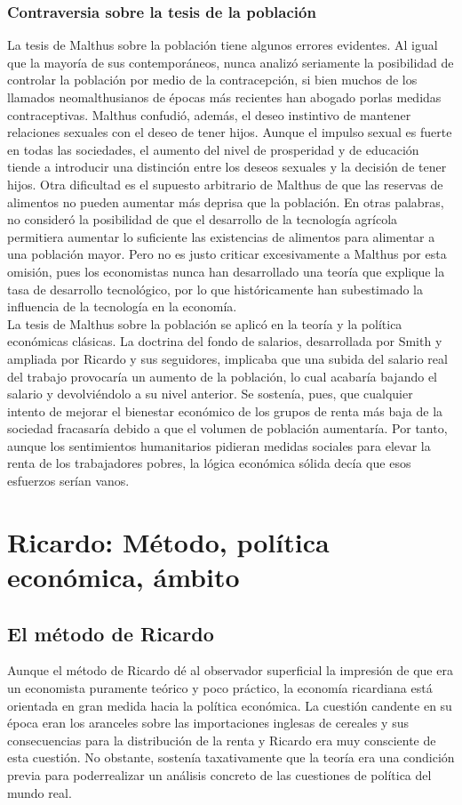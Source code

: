 \documentclass[10pt]{book}
\begin{document}
\subsubsection*{Contraversia sobre la tesis de la población}
La tesis de Malthus sobre la población tiene algunos errores evidentes. Al igual que la mayoría de sus contemporáneos, nunca analizó seriamente la posibilidad de controlar la población por medio de la contracepción, si bien muchos de los llamados neomalthusianos de épocas más recientes han abogado porlas medidas contraceptivas. Malthus confudió, además, el deseo instintivo de mantener relaciones sexuales con el deseo de tener hijos. Aunque el impulso sexual es fuerte en todas las sociedades, el aumento del nivel de prosperidad y de educación tiende a introducir una distinción entre los deseos sexuales y la decisión de tener hijos. Otra dificultad es el supuesto arbitrario de Malthus de que las reservas de alimentos no pueden aumentar más deprisa que la población. En otras palabras, no consideró la posibilidad de que el desarrollo de la tecnología agrícola permitiera aumentar lo suficiente las existencias de alimentos para alimentar a una población mayor. Pero no es justo criticar excesivamente a Malthus por esta omisión, pues los economistas nunca han desarrollado una teoría que explique la tasa de desarrollo tecnológico, por lo que históricamente han subestimado la influencia de la tecnología en la economía.\\
La tesis de Malthus sobre la población se aplicó en la teoría y la política económicas clásicas. La doctrina del fondo de salarios, desarrollada por Smith y ampliada por Ricardo y sus seguidores, implicaba que una subida del salario real del trabajo provocaría un aumento de la población, lo cual acabaría bajando el salario y devolviéndolo a su nivel anterior. Se sostenía, pues, que cualquier intento de mejorar el bienestar económico de los grupos de renta más baja de la sociedad fracasaría debido a que el volumen de población aumentaría. Por tanto, aunque los sentimientos humanitarios pidieran medidas sociales para elevar la renta de los trabajadores pobres, la lógica económica sólida decía que esos esfuerzos serían vanos.

\section*{Ricardo: Método, política económica, ámbito}

\subsection*{El método de Ricardo}
Aunque el método de Ricardo dé al observador superficial la impresión de que era un economista puramente teórico y poco práctico, la economía ricardiana está orientada en gran medida hacia la política económica. La cuestión candente en su época eran los aranceles sobre las importaciones inglesas de cereales y sus consecuencias para la distribución de la renta y Ricardo era muy consciente de esta cuestión. No obstante, sostenía taxativamente que la teoría era una condición previa para poderrealizar un análisis concreto de las cuestiones de política del mundo real.
\end{document}
